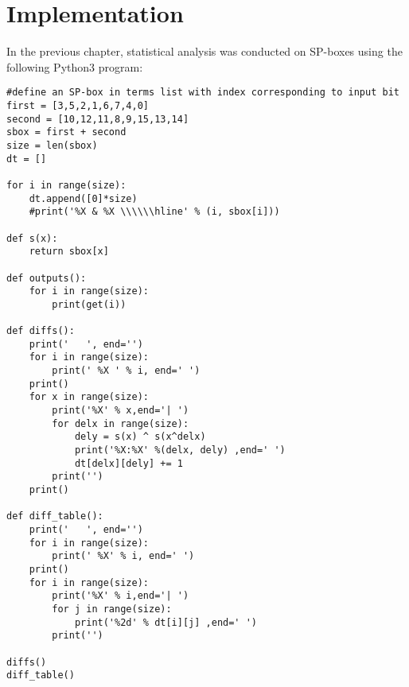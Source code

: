 



\chapter{Implementation} \label{c:implementation}

In the previous chapter, statistical analysis was conducted on
SP-boxes using the following Python3 program:

\begin{verbatim}
#define an SP-box in terms list with index corresponding to input bit
first = [3,5,2,1,6,7,4,0]
second = [10,12,11,8,9,15,13,14]
sbox = first + second
size = len(sbox)
dt = []

for i in range(size):
    dt.append([0]*size)
    #print('%X & %X \\\\\\hline' % (i, sbox[i]))

def s(x):
    return sbox[x]

def outputs():
    for i in range(size):
        print(get(i))

def diffs():
    print('   ', end='')
    for i in range(size):
        print(' %X ' % i, end=' ')
    print()
    for x in range(size):
        print('%X' % x,end='| ')
        for delx in range(size):
            dely = s(x) ^ s(x^delx)
            print('%X:%X' %(delx, dely) ,end=' ')
            dt[delx][dely] += 1
        print('')
    print()

def diff_table():
    print('   ', end='')
    for i in range(size):
        print(' %X' % i, end=' ')
    print()
    for i in range(size):
        print('%X' % i,end='| ')
        for j in range(size):
            print('%2d' % dt[i][j] ,end=' ')
        print('')

diffs()
diff_table()
\end{verbatim}
